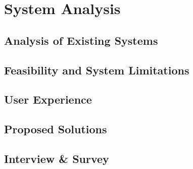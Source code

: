 
\chapter{System Analysis}

\section {Analysis of Existing Systems}

\section{Feasibility and System Limitations}

\section{User Experience}

\section{Proposed Solutions}

\section{Interview \& Survey}
